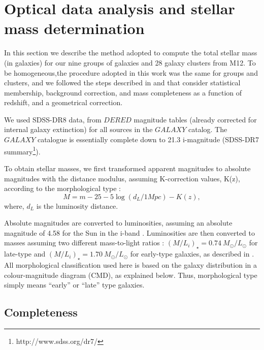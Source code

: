 \documentclass{aa}
\begin{document}
\addtocounter{table}{1}

\section{Optical data analysis and stellar mass determination}
\label{sec:stellmass}

In this section we describe the method adopted to compute the
  total stellar mass (in galaxies) for our nine groups of galaxies and 28
  galaxy clusters from M12.  To be homogeneous,the procedure adopted
  in this work was the same for groups and clusters, and we followed
  the steps described in \citet{giodini09} and \citet{bolzonella10}
  that consider statistical membership, background
  correction, and mass completeness as a function of redshift, and a
  geometrical correction.

We used SDSS-DR8 data, from $DERED$ magnitude tables (already
  corrected for internal galaxy extinction) for all sources in the
  $GALAXY$ catalog.  The $GALAXY$ catalogue is essentially complete
  down to 21.3 i-magnitude (SDSS-DR7
  summary\footnote{http://www.sdss.org/dr7/}).

To obtain stellar masses, we first transformed apparent
  magnitudes to absolute magnitudes with the distance modulus, assuming
  K-correction values, K(z), according to the morphological type
  \citep[tables from][]{poggianti97}:
\begin{equation}
M=m-25 - 5 \log(d_{L}/ 1 Mpc) - K (z), 
\end{equation}
where, $d_{L}$ is the luminosity distance.

Absolute magnitudes are converted to luminosities, assuming an
  absolute magnitude of 4.58 for the Sun in the i-band
  \citep{Blanton03}. Luminosities are then converted to masses
  assuming two different mass-to-light ratios \citep[from][]{kauff03}:
  $(M/L_{i})_{\star}=0.74\ M_{\odot}/L_{\odot}$ for late-type and
  $(M/L_{i})_{\star}=1.70\ M_{\odot}/L_{\odot}$ for early-type
  galaxies, as described in \citet{lagana08}.  
  All morphological classification used here is based on the galaxy distribution in a colour-magnitude diagram (CMD), 
  as explained below. Thus, morphological type simply means ``early'' or ``late'' type galaxies.

  
  
\subsection{Completeness}
\end{document}
